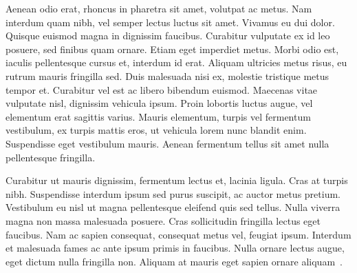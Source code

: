 Aenean odio erat, rhoncus in pharetra sit amet, volutpat ac metus. Nam interdum quam nibh, vel semper lectus luctus sit amet. Vivamus eu dui dolor. Quisque euismod magna in dignissim faucibus. Curabitur vulputate ex id leo posuere, sed finibus quam ornare. Etiam eget imperdiet metus. Morbi odio est, iaculis pellentesque cursus et, interdum id erat. Aliquam ultricies metus risus, eu rutrum mauris fringilla sed. Duis malesuada nisi ex, molestie tristique metus tempor et. Curabitur vel est ac libero bibendum euismod. Maecenas vitae vulputate nisl, dignissim vehicula ipsum. Proin lobortis luctus augue, vel elementum erat sagittis varius. Mauris elementum, turpis vel fermentum vestibulum, ex turpis mattis eros, ut vehicula lorem nunc blandit enim. Suspendisse eget vestibulum mauris. Aenean fermentum tellus sit amet nulla pellentesque fringilla.

Curabitur ut mauris dignissim, fermentum lectus et, lacinia ligula. Cras at turpis nibh. Suspendisse interdum ipsum sed purus suscipit, ac auctor metus pretium. Vestibulum eu nisl ut magna pellentesque eleifend quis sed tellus. Nulla viverra magna non massa malesuada posuere. Cras sollicitudin fringilla lectus eget faucibus. Nam ac sapien consequat, consequat metus vel, feugiat ipsum. Interdum et malesuada fames ac ante ipsum primis in faucibus. Nulla ornare lectus augue, eget dictum nulla fringilla non. Aliquam at mauris eget sapien ornare aliquam~\cite{book-without-title}.